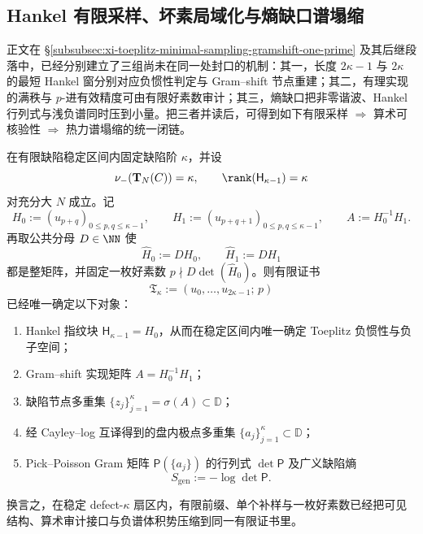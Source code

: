 \subsection{Hankel 有限采样、坏素局域化与熵缺口谱塌缩}

正文在 \S\ref{subsubsec:xi-toeplitz-minimal-sampling-gramshift-one-prime} 及其后继段落中，已经分别建立了三组尚未在同一处封口的机制：其一，长度 \(2\kappa-1\) 与 \(2\kappa\) 的最短 Hankel 窗分别对应负惯性判定与 Gram--shift 节点重建；其二，有理实现的满秩与 \(p\)-进有效精度可由有限好素数审计；其三，熵缺口把非零谐波、Hankel 行列式与浅负谱同时压到小量。把三者并读后，可得到如下有限采样 \(\Longrightarrow\) 算术可核验性 \(\Longrightarrow\) 热力谱塌缩的统一闭链。

\begin{theorem}\label{thm:derived-hankel-finite-jet-bad-prime-closure}
在有限缺陷稳定区间内固定缺陷阶 \(\kappa\)，并设
\[
\nu_-(\mathbf T_N(C))=\kappa,
\qquad
\rank(\mathsf H_{\kappa-1})=\kappa
\]
对充分大 \(N\) 成立。记
\[
H_0:=(u_{p+q})_{0\le p,q\le \kappa-1},
\qquad
H_1:=(u_{p+q+1})_{0\le p,q\le \kappa-1},
\qquad
A:=H_0^{-1}H_1.
\]
再取公共分母 \(D\in\NN\) 使
\[
\widehat H_0:=DH_0,\qquad \widehat H_1:=DH_1
\]
都是整矩阵，并固定一枚好素数 \(p\nmid D\det(\widehat H_0)\)。则有限证书
\[
\mathfrak T_\kappa:=(u_0,\dots,u_{2\kappa-1};\,p)
\]
已经唯一确定以下对象：
\begin{enumerate}
\normalfont
  \item Hankel 指纹块 \(\mathsf H_{\kappa-1}=H_0\)，从而在稳定区间内唯一确定 Toeplitz 负惯性与负子空间；
  \item Gram--shift 实现矩阵 \(A=H_0^{-1}H_1\)；
  \item 缺陷节点多重集 \(\{z_j\}_{j=1}^{\kappa}=\sigma(A)\subset\mathbb D\)；
  \item 经 Cayley--log 互译得到的盘内极点多重集 \(\{a_j\}_{j=1}^{\kappa}\subset\mathbb D\)；
  \item Pick--Poisson Gram 矩阵 \(\mathsf P(\{a_j\})\) 的行列式 \(\det\mathsf P\) 及广义缺陷熵
  \[
  S_{\mathrm{gen}}:=-\log\det\mathsf P.
  \]
\end{enumerate}
换言之，在稳定 defect-\(\kappa\) 扇区内，有限前缀、单个补样与一枚好素数已经把可见结构、算术审计接口与负谱体积势压缩到同一有限证书里。
\end{theorem}

